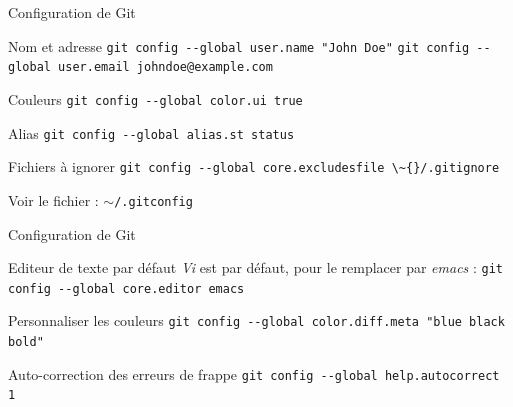 \documentclass{beamer}
\begin{document}
\begin{frame}{Configuration de Git}

  \begin{block}{Nom et adresse}
    \textcolor{commandcolor}{\verb?git config --global user.name "John Doe"?}\linebreak
    \textcolor{commandcolor}{\verb?git config --global user.email johndoe@example.com?}
  \end{block}

  \begin{block}{Couleurs}
    \textcolor{commandcolor}{\verb?git config --global color.ui true?}
  \end{block}

  \begin{block}{Alias}
    \textcolor{commandcolor}{\verb?git config --global alias.st status?}
  \end{block}

  \begin{block}{Fichiers à ignorer}
    \textcolor{commandcolor}{\verb?git config --global core.excludesfile \~{}/.gitignore?}
  \end{block}

  Voir le fichier : $\sim$\verb?/.gitconfig?

\end{frame}

\begin{frame}{Configuration de Git}

  \begin{block}{Editeur de texte par défaut}
    \textit{Vi} est par défaut, pour le remplacer par \textit{emacs} :\linebreak
    \textcolor{commandcolor}{\verb?git config --global core.editor emacs?}
  \end{block}
  
  \begin{block}{Personnaliser les couleurs}
    \textcolor{commandcolor}{\verb?git config --global color.diff.meta "blue black bold"?}
  \end{block}
  
  \begin{block}{Auto-correction des erreurs de frappe}
    \textcolor{commandcolor}{\verb?git config --global help.autocorrect 1?}
  \end{block}
  
\end{frame}
\end{document}
